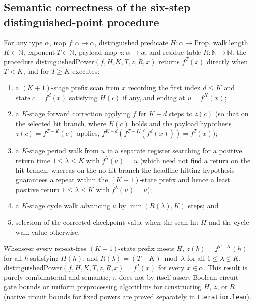 \begin{result}
\subsection{Semantic correctness of the six-step distinguished-point procedure}
For any type $\alpha$, map $f:\alpha\to\alpha$, distinguished predicate $H:\alpha\to\mathrm{Prop}$,
walk length $K\in\mathbb N$, exponent $T\in\mathbb N$, payload map $z:\alpha\to\alpha$, and residue
table $R:\mathbb N\to\mathbb N$, the procedure $\mathrm{distinguishedPower}(f,H,K,T,z,R,x)$ returns
$f^T(x)$ directly when $T<K$, and for $T\ge K$ executes:
\begin{enumerate}
\item a $(K+1)$-stage prefix scan from $x$ recording the first index $d\le K$ and state $c=f^d(x)$
satisfying $H(c)$ if any, and ending at $u=f^K(x)$;
\item a $K$-stage forward correction applying $f$ for $K-d$ steps to $z(c)$ (so that on the
selected hit branch, where $H(c)$ holds and the payload hypothesis $z(c)=f^{T-K}(c)$ applies,
$f^{K-d}(f^{T-K}(f^d(x)))=f^T(x)$);
\item a $K$-stage period walk from $u$ in a separate register searching for a positive return time
$1\le\lambda\le K$ with $f^\lambda(u)=u$ (which need not find a return on the hit branch, whereas
on the no-hit branch the headline hitting hypothesis guarantees a repeat within the $(K+1)$-state
prefix and hence a least positive return $1\le\lambda\le K$ with $f^\lambda(u)=u$);
\item a $K$-stage cycle walk advancing $u$ by $\min(R(\lambda),K)$ steps; and
\item selection of the corrected checkpoint value when the scan hit $H$ and the cycle-walk value
otherwise.
\end{enumerate}
Whenever every repeat-free $(K+1)$-state prefix meets $H$, $z(h)=f^{T-K}(h)$ for all $h$
satisfying $H(h)$, and $R(\lambda)=(T-K)\bmod\lambda$ for all $1\le\lambda\le K$,
$\mathrm{distinguishedPower}(f,H,K,T,z,R,x)=f^T(x)$ for every $x\in\alpha$.
This result is purely combinatorial and semantic; it does not by itself assert Boolean circuit
gate bounds or uniform preprocessing algorithms for constructing $H$, $z$, or $R$ (native circuit
bounds for fixed powers are proved separately in \texttt{Iteration.lean}).
\citep{Schlesinger2026IteratedFunctions}

\end{result}

